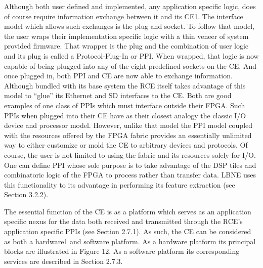 Although both user defined and implemented, any application specific logic, does of course require information exchange between it and its CE1. The interface model which allows such exchanges is the plug and socket. To follow that model, the user wraps their implementation specific logic with a thin veneer of system provided firmware. That wrapper is the plug and the combination of user logic and its plug is called a Protocol-Plug-In or PPI. When wrapped, that logic is now capable of being plugged into any of the eight predefined sockets on the CE. And once plugged in, both PPI and CE are now able to exchange information.
Although bundled with its base system the RCE itself takes advantage of this model to “glue” its Ethernet and SD interfaces to the CE. Both are good examples of one class of PPIs which must interface outside their FPGA.  Such PPIs when plugged into their CE have as their closest analogy the classic I/O device and processor model. However, unlike that model the PPI model coupled with the resources offered by the FPGA fabric provides an essentially unlimited way to either customize or mold the CE to arbitrary devices and protocols. Of course, the user is not limited to using the fabric and its resources solely for I/O. One can define PPI whose sole purpose is to take advantage of the DSP tiles and combinatoric logic of the FPGA to process rather than transfer data. LBNE uses this functionality to its advantage in performing its feature extraction (see Section 3.2.2).

The essential function of the CE is as a platform which serves as an application specific nexus for the data both received and transmitted through the RCE's application specific PPIs (see Section 2.7.1). As such, the CE can be considered as both a hardware1 and software platform. As a hardware platform its principal blocks are illustrated in Figure 12. As a software platform its corresponding services are described in Section 2.7.3.

